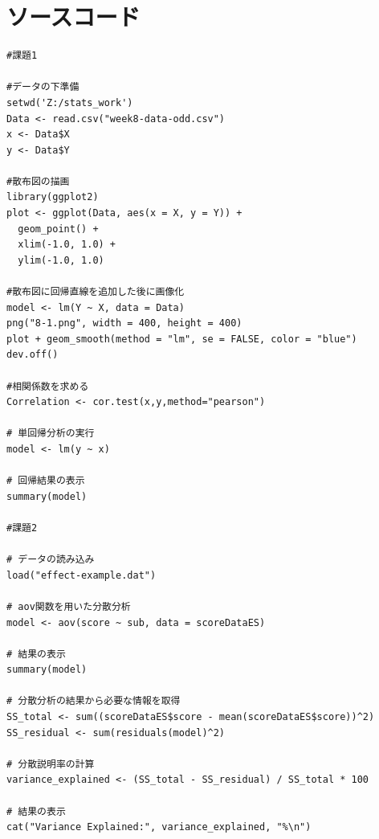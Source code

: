 \documentclass[fontsize = 10pt, paper= a4]{jlreq}
\begin{document}
\section{ソースコード}
\begin{lstlisting}[basicstyle=\ttfamily\footnotesize, frame=single]
    #課題1

#データの下準備
setwd('Z:/stats_work')
Data <- read.csv("week8-data-odd.csv")
x <- Data$X
y <- Data$Y

#散布図の描画
library(ggplot2)
plot <- ggplot(Data, aes(x = X, y = Y)) +
  geom_point() +
  xlim(-1.0, 1.0) +
  ylim(-1.0, 1.0)

#散布図に回帰直線を追加した後に画像化
model <- lm(Y ~ X, data = Data)
png("8-1.png", width = 400, height = 400)
plot + geom_smooth(method = "lm", se = FALSE, color = "blue")
dev.off()

#相関係数を求める
Correlation <- cor.test(x,y,method="pearson")

# 単回帰分析の実行
model <- lm(y ~ x)

# 回帰結果の表示
summary(model)

#課題2

# データの読み込み
load("effect-example.dat")

# aov関数を用いた分散分析
model <- aov(score ~ sub, data = scoreDataES)

# 結果の表示
summary(model)

# 分散分析の結果から必要な情報を取得
SS_total <- sum((scoreDataES$score - mean(scoreDataES$score))^2)
SS_residual <- sum(residuals(model)^2)

# 分散説明率の計算
variance_explained <- (SS_total - SS_residual) / SS_total * 100

# 結果の表示
cat("Variance Explained:", variance_explained, "%\n")
    \end{lstlisting}
\end{document}
